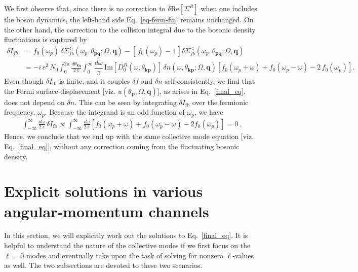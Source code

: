 \documentclass[aps, prb, onecolumn, nofootinbib, citeautoscript, 10pt]{revtex4-2}
\def \nn{\nonumber \\}
\newcommand{\bk}{\mathbf{k}}
\newcommand{\bp}{\mathbf{p}}
\newcommand{\bq}{\mathbf{q}}
\begin{document}
We first observe that, since there is no correction to $\delta \text{Re} [\Sigma^R] $ when one includes the boson dynamics, the left-hand side Eq.~\eqref{eq-ferm-fin} remains unchanged. On the other hand, the correction to the collision integral due to the bosonic density fluctuations is captured by
\begin{align}
\delta I_{fb} & =  
f_0(\omega_p) \, \delta\Sigma_{fb}^>(\omega_p, \theta_{\bp\bq} ;   \Omega, \bq )
- \left [\, f_0(\omega_p)-1 \,\right ]
\delta \Sigma_{fb}^<(\omega_p, \theta_{\bp\bq} ;   \Omega, \bq ) \nn
&= -i \,e^2 \,N_0 \int_0^{2\pi} \frac{d\theta_{\bk\bq}}{2 \,\pi}
\int_0^{\infty}\dfrac{d\omega}{\pi}  
\, \text{Im} [ D_0^R( \omega, \theta_{\bk\bp} )] \,
\delta n( \omega, \theta_{\bk\bp};  \Omega, \bq ) 
\left[f_0(\omega_p + \omega) + f_0(\omega_p-\omega)-2 \,  f_0(\omega_p)\right].
\label{eq-coll-int}
\end{align}
Even though $\delta I_{\text{fb}}$ is finite, and it couples $\delta f$ and $\delta n$ self-consistently, we find that the Fermi surface displacement [viz. $u(\theta_{\bp};  \Omega, \bq )$], as arises in Eq.~\eqref{final_eq}, does not depend on $\delta n$. This can be seen by integrating $\delta I_{\text{fb}}$ over the fermionic frequency, $\omega_p$. Because the integrand is an odd function of $\omega_p$, we have
\begin{align}
	\int_{-\infty}^\infty \frac{d\omega}{ 2 \, \pi }
	\, \delta I_{\text{fb}}\propto  \int_{-\infty}^\infty \frac{d\omega}{ 2 \, \pi } \left[f_0(\omega_p  +  \omega)
	+  f_0(\omega_p-\omega)-2 f_0(\omega_p)\right]=0\,.
\end{align}
Hence, we conclude that we end up with the same collective mode equation [viz. Eq.~\eqref{final_eq}], without any correction coming from the fluctuating bosonic density. 




\section{Explicit solutions in various angular-momentum channels}
\label{secsol}

In this section, we will explicitly work out the solutions to Eq.~\eqref{final_eq}. It is helpful to understand the nature of the collective modes if we first focus on the $\ell  = 0$ modes and eventually take upon the task of solving for nonzero $\ell$-values as well. The two subsections are devoted to these two scenarios.
\end{document}
